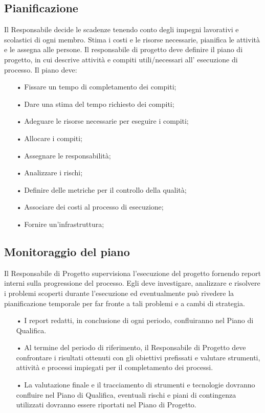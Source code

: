 \subsection{Pianificazione}
Il Responsabile decide le scadenze tenendo conto degli impegni lavorativi e scolastici di ogni membro. Stima i costi e le risorse necessarie, pianifica le attività e le assegna alle persone. 
\newline
Il responsabile di progetto deve definire il piano di progetto, in cui descrive attività e compiti utili/necessari all’ esecuzione di processo.  
\newline
Il piano deve:
\begin{itemize}
\item[•] Fissare un tempo di completamento dei compiti;
\item[•] Dare una stima del tempo richiesto dei compiti;
\item[•] Adeguare le risorse necessarie per eseguire i compiti;
\item[•] Allocare i compiti;
\item[•] Assegnare le responsabilità; 
\item[•] Analizzare i rischi;
\item[•] Definire delle metriche per il controllo della qualità;
\item[•] Associare dei costi al processo di esecuzione;
\item[•] Fornire un’infrastruttura;
\end{itemize}

\subsection{Monitoraggio del piano}
Il Responsabile di Progetto supervisiona l'esecuzione del progetto fornendo report interni sulla progressione del processo. 
\newline
Egli deve investigare, analizzare e risolvere i problemi scoperti durante l'esecuzione ed eventualmente può rivedere la pianificazione temporale per far fronte a tali problemi e a cambi di strategia.
\begin{itemize}
\item[•] I report redatti, in conclusione di ogni periodo, confluiranno nel Piano di Qualifica.
\item[•] Al termine del periodo di riferimento, il Responsabile di Progetto deve confrontare i risultati ottenuti con gli obiettivi prefissati e valutare strumenti, attività e processi impiegati per il completamento dei processi.
\item[•] La valutazione finale e il tracciamento di strumenti e tecnologie dovranno confluire nel Piano di Qualifica, eventuali rischi e piani di contingenza utilizzati dovranno essere riportati nel Piano di Progetto. 
\end{itemize}

